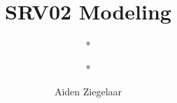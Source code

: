 \documentclass[draft]{article}
\begin{document}
\title{SRV02 Modeling}
\author{*
\and *
\and Aiden Ziegelaar }
\maketitle
\tableofcontents


\newpage
\end{document}
